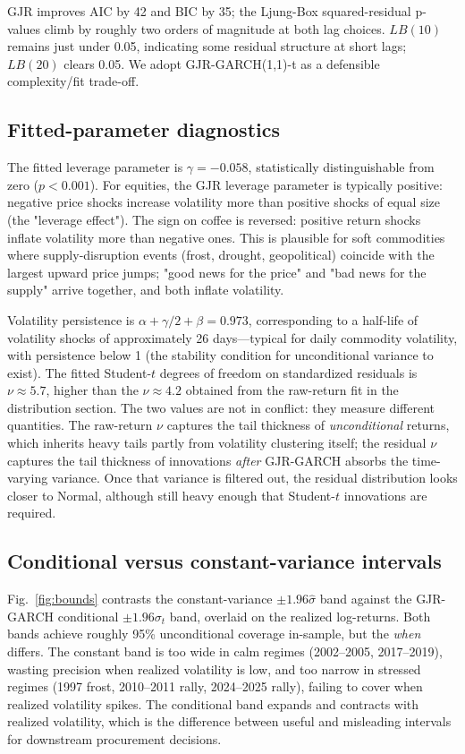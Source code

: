 \documentclass[conference]{IEEEtran}
\begin{document}
GJR improves AIC by 42 and BIC by 35; the Ljung-Box squared-residual
p-values climb by roughly two orders of magnitude at both lag
choices. $LB(10)$ remains just under 0.05, indicating some residual
structure at short lags; $LB(20)$ clears 0.05. We adopt
GJR-GARCH(1{,}1)-t as a defensible complexity/fit trade-off.

\subsection{Fitted-parameter diagnostics}

The fitted leverage parameter is $\gamma = -0.058$, statistically
distinguishable from zero ($p < 0.001$). For equities, the GJR
leverage parameter is typically positive: negative price shocks
increase volatility more than positive shocks of equal size (the
"leverage effect"). The sign on coffee is reversed: positive return
shocks inflate volatility more than negative ones. This is plausible
for soft commodities where supply-disruption events (frost, drought,
geopolitical) coincide with the largest upward price jumps;
"good news for the price" and "bad news for the supply" arrive
together, and both inflate volatility.

Volatility persistence is
$\alpha + \gamma/2 + \beta = 0.973$, corresponding to a half-life of
volatility shocks of approximately 26 days---typical for daily
commodity volatility, with persistence below 1 (the stability
condition for unconditional variance to exist). The fitted Student-$t$
degrees of freedom on standardized residuals is $\nu \approx 5.7$,
higher than the $\nu \approx 4.2$ obtained from the raw-return fit
in the distribution section. The two values are not in conflict:
they measure different quantities. The raw-return $\nu$ captures the
tail thickness of \emph{unconditional} returns, which inherits heavy
tails partly from volatility clustering itself; the residual $\nu$
captures the tail thickness of innovations \emph{after} GJR-GARCH
absorbs the time-varying variance. Once that variance is filtered
out, the residual distribution looks closer to Normal, although
still heavy enough that Student-$t$ innovations are required.

\subsection{Conditional versus constant-variance intervals}

Fig.~\ref{fig:bounds} contrasts the constant-variance
$\pm 1.96 \hat\sigma$ band against the GJR-GARCH conditional
$\pm 1.96 \sigma_t$ band, overlaid on the realized log-returns. Both
bands achieve roughly 95\% unconditional coverage in-sample, but the
\emph{when} differs. The constant band is too wide in calm regimes
(2002--2005, 2017--2019), wasting precision when realized volatility
is low, and too narrow in stressed regimes (1997 frost, 2010--2011
rally, 2024--2025 rally), failing to cover when realized volatility
spikes. The conditional band expands and contracts with realized
volatility, which is the difference between useful and misleading
intervals for downstream procurement decisions.
\end{document}
